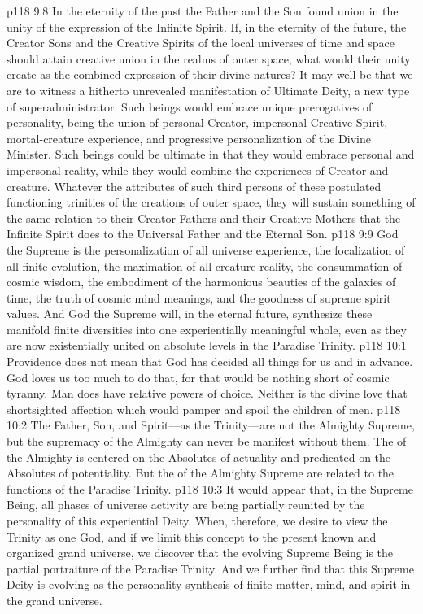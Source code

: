 \vs p118 9:8 In the eternity of the past the Father and the Son found union in the unity of the expression of the Infinite Spirit. If, in the eternity of the future, the Creator Sons and the Creative Spirits of the local universes of time and space should attain creative union in the realms of outer space, what would their unity create as the combined expression of their divine natures? It may well be that we are to witness a hitherto unrevealed manifestation of Ultimate Deity, a new type of superadministrator. Such beings would embrace unique prerogatives of personality, being the union of personal Creator, impersonal Creative Spirit, mortal\hyp{}creature experience, and progressive personalization of the Divine Minister. Such beings could be ultimate in that they would embrace personal and impersonal reality, while they would combine the experiences of Creator and creature. Whatever the attributes of such third persons of these postulated functioning trinities of the creations of outer space, they will sustain something of the same relation to their Creator Fathers and their Creative Mothers that the Infinite Spirit does to the Universal Father and the Eternal Son.
\pc \vs p118 9:9 God the Supreme is the personalization of all universe experience, the focalization of all finite evolution, the maximation of all creature reality, the consummation of cosmic wisdom, the embodiment of the harmonious beauties of the galaxies of time, the truth of cosmic mind meanings, and the goodness of supreme spirit values. And God the Supreme will, in the eternal future, synthesize these manifold finite diversities into one experientially meaningful whole, even as they are now existentially united on absolute levels in the Paradise Trinity.
\vs p118 10:1 Providence does not mean that God has decided all things for us and in advance. God loves us too much to do that, for that would be nothing short of cosmic tyranny. Man does have relative powers of choice. Neither is the divine love that shortsighted affection which would pamper and spoil the children of men.
\pc \vs p118 10:2 The Father, Son, and Spirit---as the Trinity---are not the Almighty Supreme, but the supremacy of the Almighty can never be manifest without them. The  of the Almighty is centered on the Absolutes of actuality and predicated on the Absolutes of potentiality. But the  of the Almighty Supreme are related to the functions of the Paradise Trinity.
\vs p118 10:3 It would appear that, in the Supreme Being, all phases of universe activity are being partially reunited by the personality of this experiential Deity. When, therefore, we desire to view the Trinity as one God, and if we limit this concept to the present known and organized grand universe, we discover that the evolving Supreme Being is the partial portraiture of the Paradise Trinity. And we further find that this Supreme Deity is evolving as the personality synthesis of finite matter, mind, and spirit in the grand universe.
